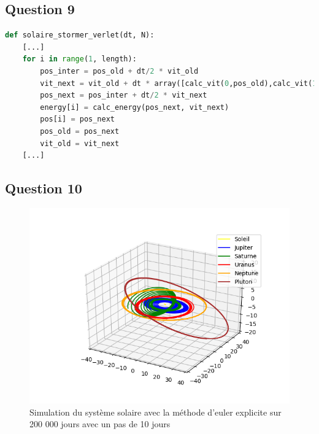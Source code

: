 \documentclass{article}
\begin{document}
\subsection*{Question 9}
\begin{lstlisting}[language=Python]
def solaire_stormer_verlet(dt, N):
    [...]
    for i in range(1, length):
        pos_inter = pos_old + dt/2 * vit_old
        vit_next = vit_old + dt * array([calc_vit(0,pos_old),calc_vit(1,pos_old),calc_vit(2,pos_old),calc_vit(3,pos_old),calc_vit(4,pos_old),calc_vit(5,pos_old)])
        pos_next = pos_inter + dt/2 * vit_next
        energy[i] = calc_energy(pos_next, vit_next)
        pos[i] = pos_next
        pos_old = pos_next
        vit_old = vit_next
    [...]
\end{lstlisting}
\newpage
\subsection*{Question 10}
\begin{figure}[!h]
\begin{center}
\includegraphics[scale=0.65]{Simulation_euler.png}
\caption{Simulation du système solaire avec la méthode d'euler explicite sur 200 000 jours avec un pas de 10 jours}
\end{center}
\end{figure}
\end{document}
